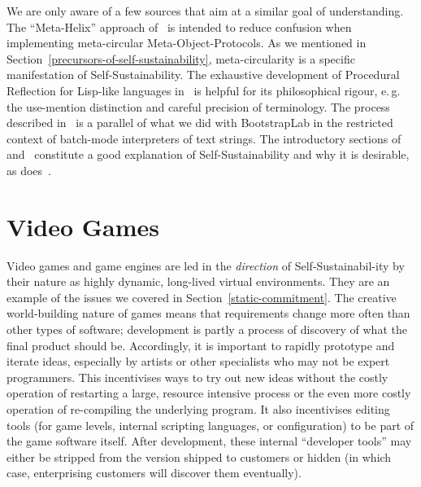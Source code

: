\documentclass[ twoside,openright,titlepage,numbers=noenddot,headinclude,footinclude,cleardoublepage=empty,abstract=on,
                BCOR=5mm,paper=a4,fontsize=11pt
                ]{scrreprt}
\newcommand{\eg}{e.\,g.}
\theoremstyle{definition}
\begin{document}
We are only aware of a few sources that aim at a similar goal of
understanding. The ``Meta-Helix'' approach of~\parencite{Meta-helix} is
intended to reduce confusion when implementing meta-circular
Meta-Object-Protocols. As we mentioned in
Section~\ref{precursors-of-self-sustainability}, meta-circularity is a
specific manifestation of Self-Sustainability. The exhaustive
development of Procedural Reflection for Lisp-like languages
in~\parencite{ProcRefl} is helpful for its philosophical rigour, \eg{}
the use-mention distinction and careful precision of terminology. The
process described in~\parencite{Bootfrom0} is a parallel of what we did
with BootstrapLab in the restricted context of batch-mode interpreters
of text strings. The introductory sections of~\parencite{COLAs}
and~\parencite{OROM} constitute a good explanation of
Self-Sustainability and why it is desirable, as
does~\parencite{CookClay}.

\hypertarget{video-games}{\section{Video Games}\label{video-games}}

Video games and game engines are led in the \emph{direction} of
Self-Sustainabil-ity by their nature as highly dynamic, long-lived
virtual environments. They are an example of the issues we covered in
Section~\ref{static-commitment}. The creative world-building nature of
games means that requirements change more often than other types of
software; development is partly a process of discovery of what the final
product should be. Accordingly, it is important to rapidly prototype and
iterate ideas, especially by artists or other specialists who may not be
expert programmers. This incentivises ways to try out new ideas without
the costly operation of restarting a large, resource intensive process
or the even more costly operation of re-compiling the underlying
program. It also incentivises editing tools (for game levels, internal
scripting languages, or configuration) to be part of the game software
itself. After development, these internal ``developer tools'' may either
be stripped from the version shipped to customers or hidden (in which
case, enterprising customers will discover them eventually).
\end{document}

